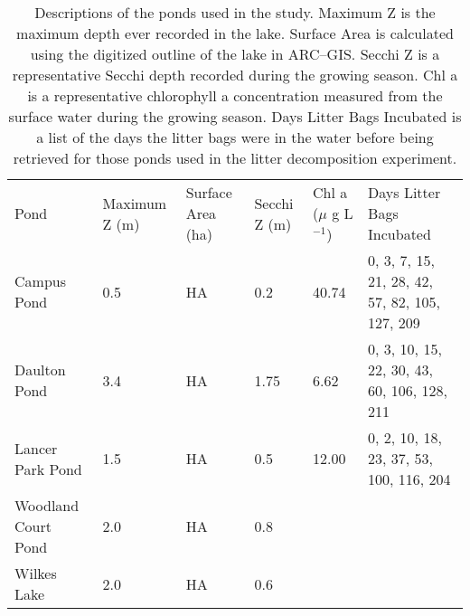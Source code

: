 \begin{table}  
\label{tab:ponds}
\begin{tabular}{l l l l l l}
Pond & Maximum Z (m) & Surface Area (ha) & Secchi Z (m) & Chl a ($\mu$ g L$^{-1}$) & Days Litter Bags Incubated \\
Campus Pond & 0.5 & HA & 0.2 & 40.74 & 0, 3, 7, 15, 21, 28, 42, 57, 82, 105, 127, 209\\
Daulton Pond & 3.4 & HA & 1.75 & 6.62 & 0, 3, 10, 15, 22, 30, 43, 60, 106, 128, 211\\
Lancer Park Pond & 1.5 & HA & 0.5 & 12.00 & 0, 2, 10, 18, 23, 37, 53, 100, 116, 204\\
Woodland Court Pond & 2.0 & HA & 0.8 & & \\
Wilkes Lake & 2.0 & HA & 0.6 & & \\
\end{tabular}
\caption{Descriptions of the ponds used in the study. Maximum Z is the maximum depth ever recorded in the lake. Surface Area is calculated using the digitized outline of the lake in ARC--GIS. Secchi Z is a representative Secchi depth recorded during the growing season. Chl a is a representative chlorophyll a concentration measured from the surface water during the growing season.  Days Litter Bags Incubated is a list of the days the litter bags were in the water before being retrieved for those ponds used in the litter decomposition experiment.}
\end{table}
